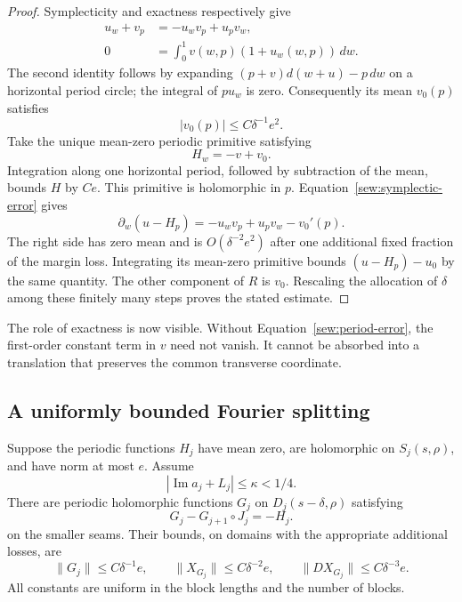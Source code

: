 \begin{proof}
Symplecticity and exactness respectively give
\begin{align}
 u_w+v_p&=-u_wv_p+u_pv_w,\label{sew:symplectic-error}\\
 0&=\int_0^1 v(w,p)(1+u_w(w,p))\,dw.
                                      \label{sew:period-error}
\end{align}
The second identity follows by expanding
$(p+v)d(w+u)-p\,dw$ on a horizontal period circle; the integral of
$p u_w$ is zero.  Consequently its mean $v_0(p)$ satisfies
\[
                  |v_0(p)|\leq C\delta^{-1}e^2.
\]
Take the unique mean-zero periodic primitive satisfying
\[
                        H_w=-v+v_0.
\]
Integration along one horizontal period, followed by subtraction of
the mean, bounds $H$ by $Ce$.  This primitive is holomorphic in $p$.
Equation~\eqref{sew:symplectic-error} gives
\[
 \partial_w(u-H_p)=-u_wv_p+u_pv_w-v_0'(p).
\]
The right side has zero mean and is $O(\delta^{-2}e^2)$ after one
additional fixed fraction of the margin loss.  Integrating its
mean-zero primitive bounds $(u-H_p)-u_0$ by the same quantity.
The other component of $R$ is $v_0$.  Rescaling the allocation of
$\delta$ among these finitely many steps proves the stated estimate.
\end{proof}

The role of exactness is now visible.  Without
Equation~\eqref{sew:period-error}, the first-order constant term in
$v$ need not vanish.  It cannot be absorbed into a translation that
preserves the common transverse coordinate.

\subsection{A uniformly bounded Fourier splitting}

\begin{lemma}\label{sew:split}
Suppose the periodic functions $H_j$ have mean zero, are holomorphic
on $S_j(s,\rho)$, and have norm at most $e$.  Assume
\[
                 |\operatorname{Im}a_j+L_j|\leq\kappa<1/4.
\]
There are periodic holomorphic functions $G_j$ on
$D_j(s-\delta,\rho)$ satisfying
\begin{equation}\label{sew:split-equation}
                  G_j-G_{j+1}\circ J_j=-H_j.
\end{equation}
on the smaller seams.  Their bounds, on domains with the appropriate
additional losses, are
\[
 \|G_j\|\leq C\delta^{-1}e,\qquad
 \|X_{G_j}\|\leq C\delta^{-2}e,\qquad
 \|DX_{G_j}\|\leq C\delta^{-3}e.
\]
All constants are uniform in the block lengths and the number of
blocks.
\end{lemma}

